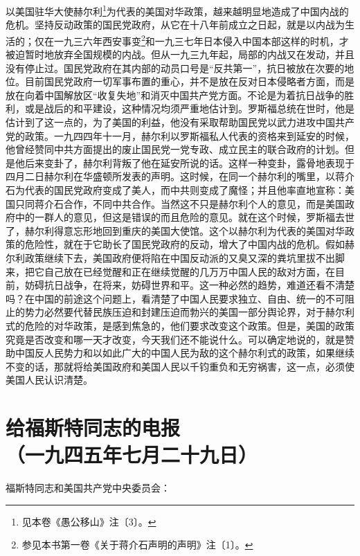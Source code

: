 \documentclass[cn,11pt,chinese]{elegantbook}
\def\myformat#1{\hfil\hfil #1}
\begin{document}
以美国驻华大使赫尔利\footnote[1]{ 见本卷《愚公移山》注〔3〕。}为代表的美国对华政策，越来越明显地造成了中国内战的危机。坚持反动政策的国民党政府，从它在十八年前成立之日起，就是以内战为生活的；仅在一九三六年西安事变\footnote[2]{ 参见本书第一卷《关于蒋介石声明的声明》注〔1〕。}和一九三七年日本侵入中国本部这样的时机，才被迫暂时地放弃全国规模的内战。但从一九三九年起，局部的内战又在发动，并且没有停止过。国民党政府在其内部的动员口号是“反共第一”，抗日被放在次要的地位。目前国民党政府一切军事布置的重心，并不是放在反对日本侵略者方面，而是放在向着中国解放区“收复失地”和消灭中国共产党方面。不论是为着抗日战争的胜利，或是战后的和平建设，这种情况均须严重地估计到。罗斯福总统在世时，他是估计到了这一点的，为了美国的利益，他没有采取帮助国民党以武力进攻中国共产党的政策。一九四四年十一月，赫尔利以罗斯福私人代表的资格来到延安的时候，他曾经赞同中共方面提出的废止国民党一党专政、成立民主的联合政府的计划。但是他后来变卦了，赫尔利背叛了他在延安所说的话。这样一种变卦，露骨地表现于四月二日赫尔利在华盛顿所发表的声明。这时候，在同一个赫尔利的嘴里，以蒋介石为代表的国民党政府变成了美人，而中共则变成了魔怪；并且他率直地宣称：美国只同蒋介石合作，不同中共合作。当然这不只是赫尔利个人的意见，而是美国政府中的一群人的意见，但这是错误的而且危险的意见。就在这个时候，罗斯福去世了，赫尔利得意忘形地回到重庆的美国大使馆。这个以赫尔利为代表的美国对华政策的危险性，就在于它助长了国民党政府的反动，增大了中国内战的危机。假如赫尔利政策继续下去，美国政府便将陷在中国反动派的又臭又深的粪坑里拔不出脚来，把它自己放在已经觉醒和正在继续觉醒的几万万中国人民的敌对方面，在目前，妨碍抗日战争，在将来，妨碍世界和平。这一种必然的趋势，难道还看不清楚吗？在中国的前途这个问题上，看清楚了中国人民要求独立、自由、统一的不可阻止的势力必然要代替民族压迫和封建压迫而勃兴的美国一部分舆论界，对于赫尔利式的危险的对华政策，是感到焦急的，他们要求改变这个政策。但是，美国的政策究竟是否改变和哪一天才改变，今天我们还不能说什么。可以确定地说的，就是赞助中国反人民势力和以如此广大的中国人民为敌的这个赫尔利式的政策，如果继续不变的话，那就将给美国政府和美国人民以千钧重负和无穷祸害，这一点，必须使美国人民认识清楚。\\
\newpage\section*{\myformat{给福斯特同志的电报}\\\myformat{（一九四五年七月二十九日）}}
福斯特同志和美国共产党中央委员会：\\
\end{document}
